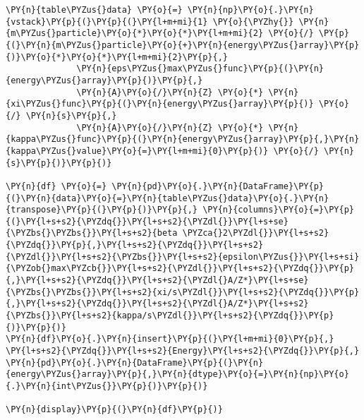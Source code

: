     \begin{tcolorbox}[breakable, size=fbox, boxrule=1pt, pad at break*=1mm,colback=cellbackground, colframe=cellborder]
\begin{Verbatim}[commandchars=\\\{\}]
\PY{n}{table\PYZus{}data} \PY{o}{=} \PY{n}{np}\PY{o}{.}\PY{n}{vstack}\PY{p}{(}\PY{p}{(}\PY{l+m+mi}{1} \PY{o}{\PYZhy{}} \PY{n}{m\PYZus{}particle}\PY{o}{*}\PY{o}{*}\PY{l+m+mi}{2} \PY{o}{/} \PY{p}{(}\PY{n}{m\PYZus{}particle}\PY{o}{+}\PY{n}{energy\PYZus{}array}\PY{p}{)}\PY{o}{*}\PY{o}{*}\PY{l+m+mi}{2}\PY{p}{,}
              \PY{n}{eps\PYZus{}max\PYZus{}func}\PY{p}{(}\PY{n}{energy\PYZus{}array}\PY{p}{)}\PY{p}{,}
              \PY{n}{A}\PY{o}{/}\PY{n}{Z} \PY{o}{*} \PY{n}{xi\PYZus{}func}\PY{p}{(}\PY{n}{energy\PYZus{}array}\PY{p}{)} \PY{o}{/} \PY{n}{s}\PY{p}{,}
              \PY{n}{A}\PY{o}{/}\PY{n}{Z} \PY{o}{*} \PY{n}{kappa\PYZus{}func}\PY{p}{(}\PY{n}{energy\PYZus{}array}\PY{p}{,}\PY{n}{kappa\PYZus{}value}\PY{o}{=}\PY{l+m+mi}{0}\PY{p}{)} \PY{o}{/} \PY{n}{s}\PY{p}{)}\PY{p}{)}

\PY{n}{df} \PY{o}{=} \PY{n}{pd}\PY{o}{.}\PY{n}{DataFrame}\PY{p}{(}\PY{n}{data}\PY{o}{=}\PY{n}{table\PYZus{}data}\PY{o}{.}\PY{n}{transpose}\PY{p}{(}\PY{p}{)}\PY{p}{,} \PY{n}{columns}\PY{o}{=}\PY{p}{(}\PY{l+s+s2}{\PYZdq{}}\PY{l+s+s2}{\PYZdl{}}\PY{l+s+se}{\PYZbs{}\PYZbs{}}\PY{l+s+s2}{beta \PYZca{}2\PYZdl{}}\PY{l+s+s2}{\PYZdq{}}\PY{p}{,}\PY{l+s+s2}{\PYZdq{}}\PY{l+s+s2}{\PYZdl{}}\PY{l+s+s2}{\PYZbs{}}\PY{l+s+s2}{epsilon\PYZus{}}\PY{l+s+si}{\PYZob{}max\PYZcb{}}\PY{l+s+s2}{\PYZdl{}}\PY{l+s+s2}{\PYZdq{}}\PY{p}{,}\PY{l+s+s2}{\PYZdq{}}\PY{l+s+s2}{\PYZdl{}A/Z*}\PY{l+s+se}{\PYZbs{}\PYZbs{}}\PY{l+s+s2}{xi/s\PYZdl{}}\PY{l+s+s2}{\PYZdq{}}\PY{p}{,}\PY{l+s+s2}{\PYZdq{}}\PY{l+s+s2}{\PYZdl{}A/Z*}\PY{l+s+s2}{\PYZbs{}}\PY{l+s+s2}{kappa/s\PYZdl{}}\PY{l+s+s2}{\PYZdq{}}\PY{p}{)}\PY{p}{)}
\PY{n}{df}\PY{o}{.}\PY{n}{insert}\PY{p}{(}\PY{l+m+mi}{0}\PY{p}{,} \PY{l+s+s2}{\PYZdq{}}\PY{l+s+s2}{Energy}\PY{l+s+s2}{\PYZdq{}}\PY{p}{,} \PY{n}{pd}\PY{o}{.}\PY{n}{DataFrame}\PY{p}{(}\PY{n}{energy\PYZus{}array}\PY{p}{,}\PY{n}{dtype}\PY{o}{=}\PY{n}{np}\PY{o}{.}\PY{n}{int\PYZus{}}\PY{p}{)}\PY{p}{)}

\PY{n}{display}\PY{p}{(}\PY{n}{df}\PY{p}{)}
\end{Verbatim}
\end{tcolorbox}

